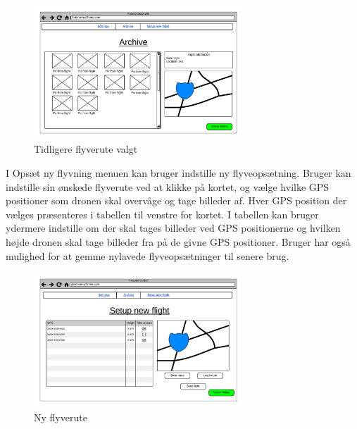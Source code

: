\vspace{-5pt}
\begin{figure}[H]
	\centering
	\includegraphics[width=0.7\textwidth]{Billeder/UI_mockups/archive_choosen.png}
	\vspace{-5pt}
	\caption{Tidligere flyverute valgt}
	\label{fig:mockup_archive_choosen}
\end{figure}

\vspace{2cm}

I Opsæt ny flyvning menuen kan bruger indstille ny flyveopsætning. 
Bruger kan indstille sin ønskede flyverute ved at klikke på kortet, og vælge hvilke GPS positioner som dronen skal overvåge og tage billeder af. 
Hver GPS position der vælges præsenteres i tabellen til venstre for kortet. 
I tabellen kan bruger ydermere indstille om der skal tages billeder ved GPS positionerne og hvilken højde dronen skal tage billeder fra på de givne GPS positioner. 
Bruger har også mulighed for at gemme nylavede flyveopsætninger til senere brug.

\vspace{-5pt}
\begin{figure}[H]
	\centering
	\includegraphics[width=0.7\textwidth]{Billeder/UI_mockups/setup_new_flight.png}
	\vspace{-5pt}
	\caption{Ny flyverute}
	\label{fig:mockup_setup_new_flight}
\end{figure}

 